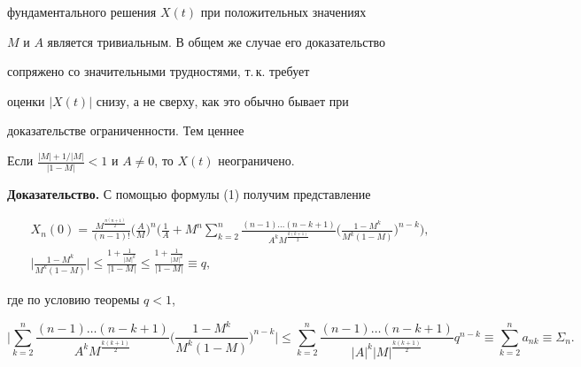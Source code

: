 фундаментального решения $X(t)$ при положительных значениях 


$M$ и $A$ является тривиальным. В общем же случае его доказательство 


сопряжено со значительными трудностями, т.\,к. требует 


оценки $|X(t)|$ снизу, а не сверху, как это обычно бывает при 


доказательстве ограниченности. Тем ценнее 


 


\begin{thm} 


Если $\frac{|M|+1/|M|}{|1-M|}<1$ и $A\ne0$, то $X(t)$ неограничено. 


\end{thm} 


 


{\bf Доказательство.} С помощью формулы (1) получим представление 


\begin{gather*} 


X_n(0)=\frac{M^{\frac{n(n+1)}{2}}}{(n-1)!} 


\bigg(\frac{A}{M} \bigg)^n\bigg(\frac{1}{A}+M^n\sum^n_{k=2} 


\frac{(n-1)\dotsc(n-k+1)}{A^k M^{\frac{k(k+1)}{2}}} 


\bigg(\frac{1-M^k}{M^k(1-M)} \bigg)^{n-k}\bigg), \\ 


% 


\bigg|\frac{1-M^k}{M^k(1-M)} \bigg|\le 


\frac{1+\frac{1}{|M|^k}}{|1-M|}\le 


\frac{1+\frac{1}{|M|^2}}{|1-M|}\equiv q, 


\end{gather*} 


где по условию теоремы $q<1$, 


$$ 


\bigg|\sum^n_{k=2}\frac{(n-1)\dotsc(n-k+1)} 


{A^k M^{\frac{k(k+1)}{2}}}\bigg(\frac{1-M^k}{M^k(1-M)} \bigg)^{n-k} 


\bigg|\le\sum^n_{k=2}\frac{(n-1)\dotsc(n-k+1)} 


{|A|^k|M|^{\frac{k(k+1)}{2}}}q^{n-k}\equiv 


\sum^n_{k=2}a_{nk}\equiv \Sigma_n. 


$$ 



